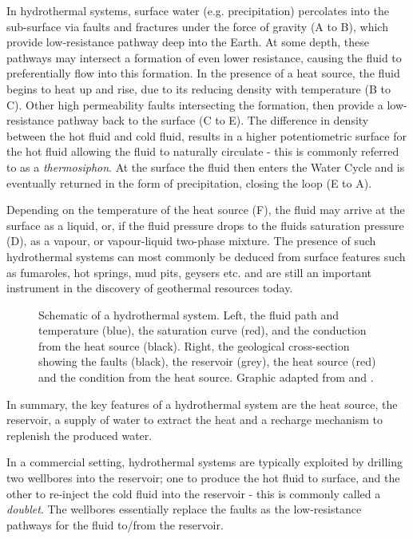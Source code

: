     In hydrothermal systems, surface water (e.g. precipitation) percolates into the sub-surface via faults and fractures under the force of gravity (A to B), which provide low-resistance pathway deep into the Earth. At some depth, these pathways may intersect a formation of even lower resistance, causing the fluid to preferentially flow into this formation. In the presence of a heat source, the fluid begins to heat up and rise, due to its reducing density with temperature (B to C). Other high permeability faults intersecting the formation, then provide a low-resistance pathway back to the surface (C to E). The difference in density between the hot fluid and cold fluid, results in a higher potentiometric surface for the hot fluid allowing the fluid to naturally circulate - this is commonly referred to as a \emph{thermosiphon}. At the surface the fluid then enters the Water Cycle and is eventually returned in the form of precipitation, closing the loop (E to A).  
    
    Depending on the temperature of the heat source (F), the fluid may arrive at the surface as a liquid, or, if the fluid  pressure drops to the fluids saturation pressure (D), as a vapour, or vapour-liquid two-phase mixture. The presence of such hydrothermal systems can most commonly be deduced from surface features such as fumaroles, hot springs, mud pits, geysers etc. and are still an important instrument in the discovery of geothermal resources today.

    \begin{figure}[H]
        \centering
                
        \caption[Schematic of a hydrothermal system]{Schematic of a hydrothermal system. Left, the fluid path and temperature (blue), the saturation curve (red), and the conduction from the heat source (black). Right, the geological cross-section showing the faults (black), the reservoir (grey), the heat source (red) and the condition from the heat source. Graphic adapted from \citeauthor{kruger1973} \cite{kruger1973} and \citeauthor{DiPippo2016} \cite{DiPippo2016}.}
        \label{fig:HydrothermalSystem}
    \end{figure}

    In summary, the key features of a hydrothermal system are the heat source, the reservoir, a supply of water to extract the heat and a recharge mechanism to replenish the produced water.

    In a commercial setting, hydrothermal systems are typically exploited by drilling two wellbores into the reservoir; one to produce the hot fluid to surface, and the other to re-inject the cold fluid into the reservoir - this is commonly called a \emph{doublet}. The wellbores essentially replace the faults as the low-resistance pathways for the fluid to/from the reservoir. 
    
